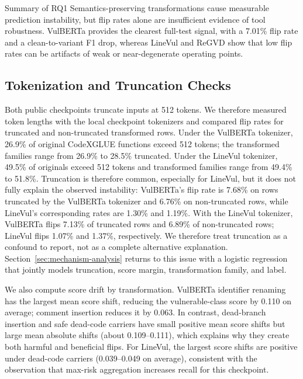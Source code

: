 \documentclass[a4paper,fleqn]{cas-dc}
\begin{document}
\begin{rqsummarybox}{Summary of RQ1}
Semantics-preserving transformations cause measurable prediction instability,
but flip rates alone are insufficient evidence of tool robustness. VulBERTa
provides the clearest full-test signal, with a 7.01\% flip rate and a
clean-to-variant F1 drop, whereas LineVul and ReGVD show that low flip rates
can be artifacts of weak or near-degenerate operating points.
\end{rqsummarybox}

\subsection{Tokenization and Truncation Checks}

Both public checkpoints truncate inputs at 512 tokens. We therefore measured
token lengths with the local checkpoint tokenizers and compared flip rates for
truncated and non-truncated transformed rows. Under the VulBERTa tokenizer,
26.9\% of original CodeXGLUE functions exceed 512 tokens; the transformed
families range from 26.9\% to 28.5\% truncated. Under the LineVul tokenizer,
49.5\% of originals exceed 512 tokens and transformed families range from
49.4\% to 51.8\%. Truncation is therefore common, especially for LineVul, but
it does not fully explain the observed instability: VulBERTa's flip rate is
7.68\% on rows truncated by the VulBERTa tokenizer and 6.76\% on non-truncated
rows, while LineVul's corresponding rates are 1.30\% and 1.19\%. With the
LineVul tokenizer, VulBERTa flips 7.13\% of truncated rows and 6.89\% of
non-truncated rows; LineVul flips 1.07\% and 1.37\%, respectively. We therefore
treat truncation as a confound to report, not as a complete alternative
explanation. Section~\ref{sec:mechanism-analysis} returns to this issue with a
logistic regression that jointly models truncation, score margin,
transformation family, and label.

We also compute score drift by transformation. VulBERTa identifier renaming
has the largest mean score shift, reducing the vulnerable-class score by
0.110 on average; comment insertion reduces it by 0.063. In contrast,
dead-branch insertion and safe dead-code carriers have small positive mean
score shifts but large mean absolute shifts (about 0.109--0.111), which
explains why they create both harmful and beneficial flips. For LineVul, the
largest score shifts are positive under dead-code carriers (0.039--0.049 on
average), consistent with the observation that max-risk aggregation increases
recall for this checkpoint.
\end{document}
